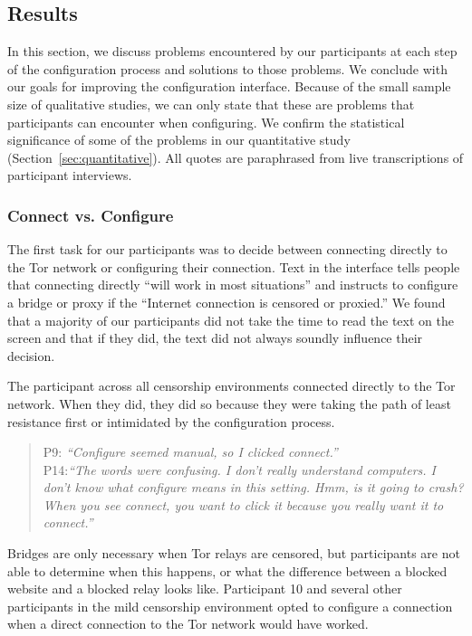 \documentclass[USenglish,oneside,twocolumn]{article}
\begin{document}
\subsection{Results} 
In this section, we discuss problems encountered by our participants at each step of the configuration process and solutions to those problems. We conclude with our goals for improving the configuration interface. Because of the small sample size of qualitative studies, we can only state that these are problems that participants can encounter when configuring. We confirm the statistical significance of some of the problems in our quantitative study (Section~\ref{sec:quantitative}). All quotes are paraphrased from live transcriptions of participant interviews.\\

\subsubsection{Connect vs. Configure} 
The first task for our participants was to decide between connecting directly to the Tor network or configuring their connection. Text in the interface tells people that connecting directly ``will work in most situations'' and instructs to configure a bridge or proxy if the ``Internet connection is censored or proxied.'' We found that a majority of our participants did not take the time to read the text on the screen and that if they did, the text did not always soundly influence their decision.

The participant across all censorship environments connected directly to the Tor network. When they did, they did so because they were taking the path of least resistance first or intimidated by the configuration process. 
\begin{quotation}
\noindent P9: \textit{``Configure seemed manual, so I clicked connect.''}\\

\noindent P14:\textit{``The words were confusing. I don't really understand computers. I don't know what configure means in this setting. Hmm, is it going to crash? When you see connect, you want to click it because you really want it to connect.''} 
\end{quotation}

Bridges are only necessary when Tor relays are censored, but participants are not able to determine when this happens, or what the difference between a blocked website and a blocked relay looks like. Participant 10 and several other participants in the mild censorship environment opted to configure a connection when a direct connection to the Tor network would have worked. 
\end{document}
